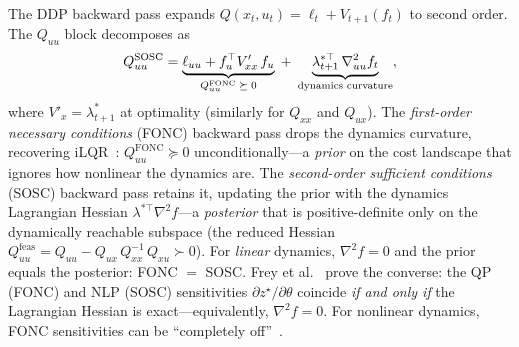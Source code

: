 \begin{remark}
\label{rem:fonc-sosc}
The DDP backward pass expands
$Q(x_t, u_t) = \ell_t + V_{t+1}(f_t)$ to second order.
The $Q_{uu}$ block decomposes as
\begin{equation}\label{eq:fonc-sosc}
Q_{uu}^{\mathrm{SOSC}}
= \underbrace{\ell_{uu} + f_u^\top V'_{xx}\, f_u}_{%
    Q_{uu}^{\mathrm{FONC}} \;\succeq\; 0}
  \;+\; \underbrace{\lambda^{*\top}_{t+1}\,\nabla^2_{uu} f_t}_{%
    \text{dynamics curvature}},
\end{equation}
where $V'_x = \lambda^*_{t+1}$ at optimality
(similarly for $Q_{xx}$ and $Q_{ux}$).
The \emph{first-order necessary conditions} (FONC) backward pass
drops the dynamics curvature, recovering
iLQR~\cite{TassaErezTodorov,MastalliCrocoddyl}:
$Q_{uu}^{\mathrm{FONC}} \succeq 0$ unconditionally---a
\emph{prior} on the cost landscape that ignores
how nonlinear the dynamics are.
The \emph{second-order sufficient conditions} (SOSC) backward pass
retains it, updating the prior with the dynamics Lagrangian Hessian
$\lambda^{*\top}\nabla^2 f$---a \emph{posterior} that is
positive-definite only on the dynamically reachable subspace
(the reduced Hessian
$Q_{uu}^{\mathrm{feas}}
= Q_{uu} - Q_{ux}\,Q_{xx}^{-1}\,Q_{xu} \succ 0$).
For \emph{linear} dynamics, $\nabla^2 f = 0$ and the prior
equals the posterior: FONC $=$ SOSC.
Frey et al.~\cite{FreyDiffMPC} prove the converse:
the QP (FONC) and NLP (SOSC) sensitivities
$\partial z^\star/\partial\theta$ coincide \emph{if and only if}
the Lagrangian Hessian is exact---equivalently, $\nabla^2 f = 0$.
For nonlinear dynamics, FONC sensitivities can be
``completely off''~\cite[Section~5.1]{FreyDiffMPC}.
\end{remark}

